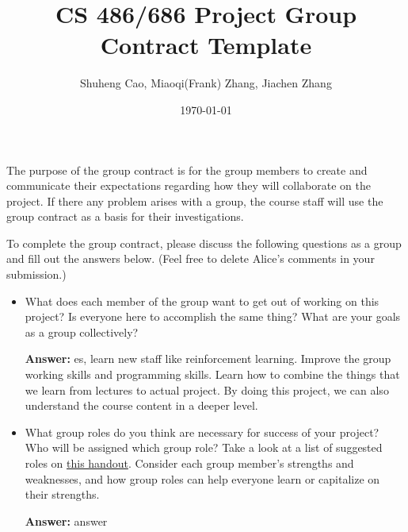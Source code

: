 \documentclass[12pt]{article}
\title{CS 486/686 Project Group Contract Template}
\author{Shuheng Cao, Miaoqi(Frank) Zhang, Jiachen Zhang}
\date{\today}
\newenvironment{answer}[1]{
\color{blue}
	{\bf Answer:}
}{
}
\begin{document}
\maketitle

The purpose of the group contract is for the group members to create and communicate their expectations regarding how they will collaborate on the project.  If there any problem arises with a group, the course staff will use the group contract as a basis for their investigations.

To complete the group contract, please discuss the following questions as a group and fill out the answers below. (Feel free to delete Alice's comments in your submission.)

\begin{itemize}
\item What does each member of the group want to get out of working on this project? Is everyone here to accomplish the same thing? What are your goals as a group collectively?

\begin{answer}

Yes, learn new staff like reinforcement learning. Improve the group working skills and programming skills. Learn how to combine the things that we learn from lectures to actual project. By doing this project, we can also understand the course content in a deeper level.
\end{answer}

\item What group roles do you think are necessary for success of your project? Who will be assigned which group role? Take a look at a list of suggested roles on \href{https://uwaterloo.ca/student-success/sites/ca.student-success/files/uploads/files/TipSheet_GroupWork_0.pdf}{this handout}.  Consider each group member’s strengths and weaknesses, and how group roles can help everyone learn or capitalize on their strengths.

\begin{answer}


\end{answer}
\end{itemize}
\end{document}
